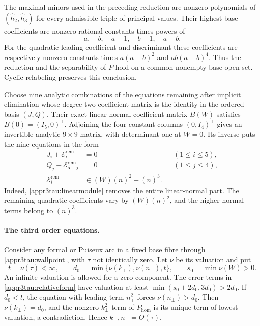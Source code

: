 \documentclass[11pt,a4paper]{article}
\numberwithin{equation}{section}
\theoremstyle{plain}
\theoremstyle{definition}
\theoremstyle{remark}
\begin{document}
The maximal minors used in the preceding reduction are nonzero
polynomials of $(\widehat h_2,\widehat h_3)$ for every admissible
triple of principal values. Their highest base coefficients are
nonzero rational constants times powers of
\[
 a,\quad b,\quad a-1,\quad b-1,\quad a-b.
\]
For the quadratic leading coefficient and discriminant these
coefficients are respectively nonzero constants times $a(a-b)^2$
and $ab(a-b)^4$. Thus the reduction and the separability of $P$
hold on a common nonempty base open set. Cyclic relabeling preserves
this conclusion.

Choose nine analytic combinations of the equations remaining after implicit elimination
whose degree two coefficient matrix is the identity in the ordered
basis $(J,Q)$.  Their exact linear-normal coefficient matrix $B(W)$
satisfies $B(0)=(I_5,0)^{\top}$.  Adjoining the four constant columns
$(0,I_4)^{\top}$ gives an invertible analytic $9\times9$ matrix, with
determinant one at $W=0$.  Its inverse puts the nine equations in the
form
\begin{equation}\label{appr3tau:relativeform}
 \begin{aligned}
 J_i+\mathcal E_i^{\mathrm{rem}}&=0 &&(1\le i\le5),\\
 Q_j+\mathcal E_{5+j}^{\mathrm{rem}}&=0 &&(1\le j\le4),\\
 \mathcal E_i^{\mathrm{rem}}&\in(W)(n)^2+(n)^3.
 \end{aligned}
\end{equation}
Indeed, \eqref{appr3tau:linearmodule} removes the entire linear-normal
part.  The remaining quadratic coefficients vary by $(W)(n)^2$, and
the higher normal terms belong to $(n)^3$.

\paragraph{The third order equations.}
Consider any formal or Puiseux arc in a fixed base fibre through
\eqref{appr3tau:wallpoint}, with $\tau$ not identically zero.  Let
$\nu$ be its valuation and put
\[
 t=\nu(\tau)<\infty,\qquad
 d_0=\min\{\nu(k_\perp),\nu(n_\perp),t\},\qquad
 s_0=\min\nu(W)>0.
\]
An infinite valuation is allowed for a zero component.  The error terms
in \eqref{appr3tau:relativeform} have valuation at least
$\min(s_0+2d_0,3d_0)>2d_0$.  If $d_0<t$, the equation with leading term
$n_\perp^2$ forces $\nu(n_\perp)>d_0$.  Then $\nu(k_\perp)=d_0$, and the nonzero
$k_\perp^2$ term of $P_{\mathrm{hom}}$ is its unique term of lowest valuation, a
contradiction.  Hence $k_\perp,n_\perp=O(\tau)$.
\end{document}
